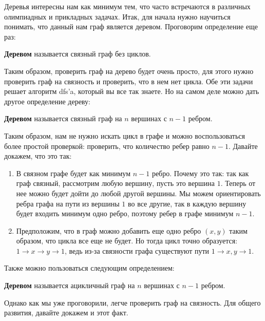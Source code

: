 \documentclass[../../main.tex]{subfiles}
\begin{document}
Деревья интересны нам как минимум тем, что часто встречаются в различных олимпиадных и прикладных задачах. Итак, для начала нужно научиться понимать, 
что данный нам граф является деревом. Проговорим определение еще раз: 


\textbf{Деревом} называется связный граф без циклов.  


Таким образом, проверить граф на дерево будет очень просто, для этого нужно проверить граф на связность и проверить, что в нем нет цикла. Обе эти задачи решает алгоритм 
dfs'a, который вы все так знаете. Но на самом деле можно дать другое определение дереву: 


\textbf{Деревом} называется связный граф на $n$ вершинах с $n-1$ ребром. 


Таким образом, нам не нужно искать цикл в графе и можно воспользоваться более простой проверкой: проверить, что количество ребер равно $n-1$. Давайте докажем, что это так:

\begin{enumerate}
    \item В связном графе будет как минимум $n-1$ ребро. Почему это так: так как граф связный, рассмотрим любую вершину, пусть это вершина $1$. 
Теперь от нее можно будет дойти до любой другой вершины. Мы можем ориентировать ребра графа на пути из вершины $1$ во все другие, так в каждую вершину будет входить минимум одно ребро,
поэтому ребер в графе минимум $n-1$. 
    \item Предположим, что в граф можно добавить еще одно ребро $(x,y)$ таким образом, что цикла все еще не будет. Но тогда цикл точно образуется: 
    $1 \rightarrow x \rightarrow y \rightarrow 1$, ведь из-за связности графа существуют пути $1 \rightarrow x, y \rightarrow 1$. 
\end{enumerate}

Также можно пользоваться следующим определением: 


\textbf{Деревом} называется ацикличный граф на $n$ вершинах с $n-1$ ребром.


Однако как мы уже проговорили, легче проверить граф на связность. Для общего развития, давайте докажем и этот факт. 
\end{document}
